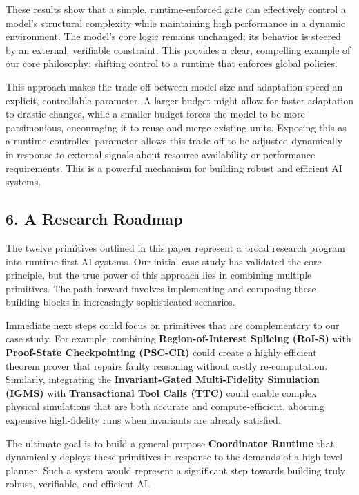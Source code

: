 \documentclass[
]{article}
\begin{document}
These results show that a simple, runtime-enforced gate can effectively
control a model's structural complexity while maintaining high
performance in a dynamic environment. The model's core logic remains
unchanged; its behavior is steered by an external, verifiable
constraint. This provides a clear, compelling example of our core
philosophy: shifting control to a runtime that enforces global policies.

This approach makes the trade-off between model size and adaptation
speed an explicit, controllable parameter. A larger budget might allow
for faster adaptation to drastic changes, while a smaller budget forces
the model to be more parsimonious, encouraging it to reuse and merge
existing units. Exposing this as a runtime-controlled parameter allows
this trade-off to be adjusted dynamically in response to external
signals about resource availability or performance requirements. This is
a powerful mechanism for building robust and efficient AI systems.

\hypertarget{a-research-roadmap}{%
\subsection{6. A Research Roadmap}\label{a-research-roadmap}}

The twelve primitives outlined in this paper represent a broad research
program into runtime-first AI systems. Our initial case study has
validated the core principle, but the true power of this approach lies
in combining multiple primitives. The path forward involves implementing
and composing these building blocks in increasingly sophisticated
scenarios.

Immediate next steps could focus on primitives that are complementary to
our case study. For example, combining \textbf{Region-of-Interest
Splicing (RoI-S)} with \textbf{Proof-State Checkpointing (PSC-CR)} could
create a highly efficient theorem prover that repairs faulty reasoning
without costly re-computation. Similarly, integrating the
\textbf{Invariant-Gated Multi-Fidelity Simulation (IGMS)} with
\textbf{Transactional Tool Calls (TTC)} could enable complex physical
simulations that are both accurate and compute-efficient, aborting
expensive high-fidelity runs when invariants are already satisfied.

The ultimate goal is to build a general-purpose \textbf{Coordinator
Runtime} that dynamically deploys these primitives in response to the
demands of a high-level planner. Such a system would represent a
significant step towards building truly robust, verifiable, and
efficient AI.
\end{document}
